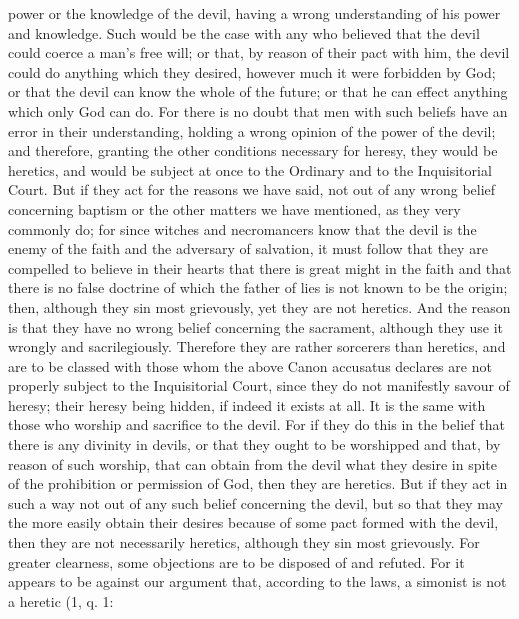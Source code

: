        power or the knowledge of the devil, having a wrong understanding of his power and
       knowledge. Such would be the case with any who believed that the devil could coerce a
       man's free will; or that, by reason of their pact with him, the devil could do anything which
       they desired, however much it were forbidden by God; or that the devil can know the whole
       of the future; or that he can effect anything which only God can do. For there is no doubt
       that men with such beliefs have an error in their understanding, holding a wrong opinion of
       the power of the devil; and therefore, granting the other conditions necessary for heresy,
       they would be heretics, and would be subject at once to the Ordinary and to the Inquisitorial
       Court.
             But if they act for the reasons we have said, not out of any wrong belief concerning
       baptism or the other matters we have mentioned, as they very commonly do; for since
       witches and necromancers know that the devil is the enemy of the faith and the adversary of
       salvation, it must follow that they are compelled to believe in their hearts that there is great
       might in the faith and that there is no false doctrine of which the father of lies is not known
       to be the origin; then, although they sin most grievously, yet they are not heretics. And the
       reason is that they have no wrong belief concerning the sacrament, although they use it
       wrongly and sacrilegiously. Therefore they are rather sorcerers than heretics, and are to be
       classed with those whom the above Canon accusatus declares are not properly subject to the
       Inquisitorial Court, since they do not manifestly savour of heresy; their heresy being hidden,
       if indeed it exists at all.
             It is the same with those who worship and sacrifice to the devil. For if they do this in
       the belief that there is any divinity in devils, or that they ought to be worshipped and that, by
       reason of such worship, that can obtain from the devil what they desire in spite of the
       prohibition or permission of God, then they are heretics. But if they act in such a way not
       out of any such belief concerning the devil, but so that they may the more easily obtain their
       desires because of some pact formed with the devil, then they are not necessarily heretics,
       although they sin most grievously.
             For greater clearness, some objections are to be disposed of and refuted. For it appears
       to be against our argument that, according to the laws, a simonist is not a heretic (1, q. 1:
